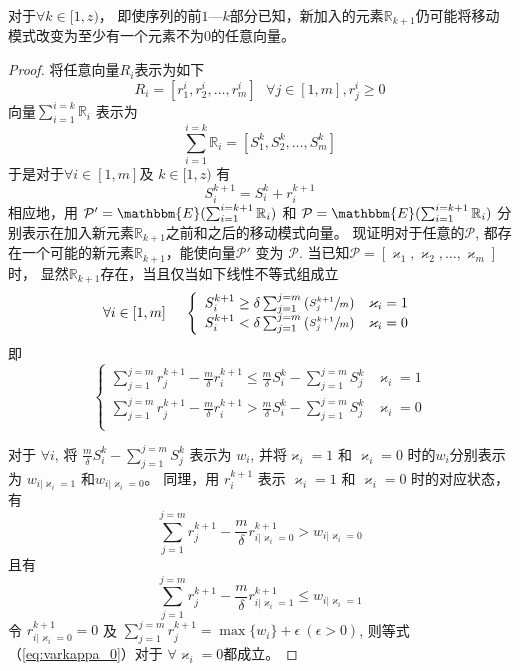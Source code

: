 \begin{theorem}
对于$\forall k\in[1,z)$， 即使序列的前$1$---$k$部分已知，新加入的元素$\mathbb{R}_{k+1}$仍可能将移动模式改变为至少有一个元素不为0的任意向量。
\label{thm:online}
\end{theorem}
\begin{proof}
将任意向量$R_i$表示为如下
\[
R_i=[r^i_1,r^i_2,\ldots,r^i_m]~~~\forall j\in[1,m], r^i_j\geq 0
\]
向量$\sum_{i=1}^{i=k}\mathbb{R}_{i}$ 表示为
\[
\sum_{i=1}^{i=k}\mathbb{R}_{i}=[S^{k}_1,S^{k}_2,\ldots,S^{k}_m]
\]
于是对于$\forall i\in [1,m]$及 $k\in [1,z)$ 有
\[
S^{k+1}_i=S^{k}_i+r^{k+1}_i
\]
相应地，用 $\mathcal{P'}=\mathbbm{E}(\sum_{i=1}^{i=k+1}\mathbb{R}_{i})$ 和 $\mathcal{P}=\mathbbm{E}(\sum_{i=1}^{i=k+1}\mathbb{R}_{i})$ 分别表示在加入新元素$\mathbb{R}_{k+1}$之前和之后的移动模式向量。 现证明对于任意的$\mathcal{P}$, 都存在一个可能的新元素$\mathbb{R}_{k+1}$，能使向量$\mathcal{P'}$ 变为 $\mathcal{P}$.
当已知$\mathcal{P}=[\varkappa _1,\varkappa _2,\ldots,\varkappa _m]$时， 显然$\mathbb{R}_{k+1}$存在，当且仅当如下线性不等式组成立
\begin{displaymath}
\forall i\in[1,m]~~~~
\left\{
\begin{array}{ll}
S^{k+1}_i\geq\delta\sum_{j=1}^{j=m}\left(\sfrac{S^{k+1}_j}{m}\right)& \varkappa_i=1 \\
S^{k+1}_i<\delta\sum_{j=1}^{j=m}\left(\sfrac{S^{k+1}_j}{m}\right) & \varkappa_i=0
\end{array}
\right.
\end{displaymath}
即
\[
\left\{
\begin{array}{ll}
\sum_{j=1}^{j=m}r_j^{k+1}-\frac{m}{\delta}r_i^{k+1}\leq \frac{m}{\delta}S_i^{k}-\sum_{j=1}^{j=m}S_j^{k} & \varkappa_i=1 \\
\sum_{j=1}^{j=m}r_j^{k+1}-\frac{m}{\delta}r_i^{k+1}> \frac{m}{\delta}S_i^{k}-\sum_{j=1}^{j=m}S_j^{k} & \varkappa_i=0 \\
\end{array}\right.
\]

对于 $\forall i$, 将 $\frac{m}{\delta}S_i^{k}-\sum_{j=1}^{j=m}S_j^{k}$ 表示为 $w_i$, 并将$\varkappa_i=1$ 和 $\varkappa_i=0$ 时的$w_i$分别表示为 $w_{i|\varkappa_i=1}$ 和$w_{i|\varkappa_i=0}$。 同理，用 $r_i^{k+1}$ 表示 $\varkappa_i=1$ 和 $\varkappa_i=0$ 时的对应状态，有
\begin{equation}
\sum_{j=1}^{j=m}r_j^{k+1}-\frac{m}{\delta}r_{i|\varkappa_i=0}^{k+1}> w_{i|\varkappa_i=0}  
\label{eq:varkappa_0}
\end{equation}
且有
\begin{equation}
\sum_{j=1}^{j=m}r_j^{k+1}-\frac{m}{\delta}r_{i|\varkappa_i=1}^{k+1}\leq w_{i|\varkappa_i=1}
\label{eq:varkappa_1}
\end{equation}
令 $r^{k+1}_{i|\varkappa_i=0}=0$ 及 $\sum_{j=1}^{j=m}r_j^{k+1}=\max\{w_i\}+\epsilon~(\epsilon>0)$, 则等式（\ref{eq:varkappa_0}）对于 $\forall \varkappa_i=0$都成立。


\end{proof}
